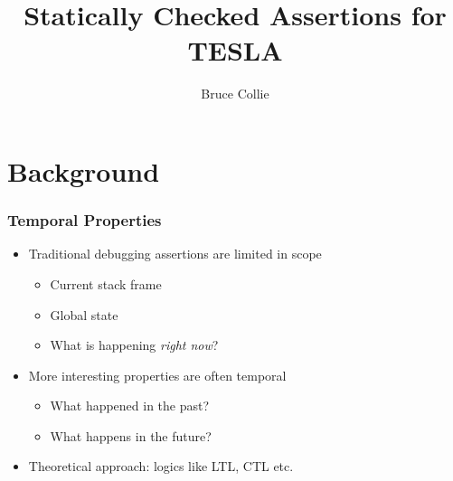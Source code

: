 \documentclass{beamer}
\title{Statically Checked Assertions for TESLA}
\author{Bruce Collie}
\begin{document}
\frame{\titlepage}

\begin{frame}
  \tableofcontents
\end{frame}

\section{Background}

\begin{frame}
  \frametitle{Temporal Properties}

  \begin{itemize}
    \item Traditional debugging assertions are limited in scope
      \begin{itemize}
        \item Current stack frame
        \item Global state
        \item What is happening \emph{right now}?
      \end{itemize}
    \item More interesting properties are often temporal
      \begin{itemize}
        \item What happened in the past?
        \item What happens in the future?
      \end{itemize}
    \item Theoretical approach: logics like LTL, CTL etc.
  \end{itemize}
\end{frame}
\end{document}
